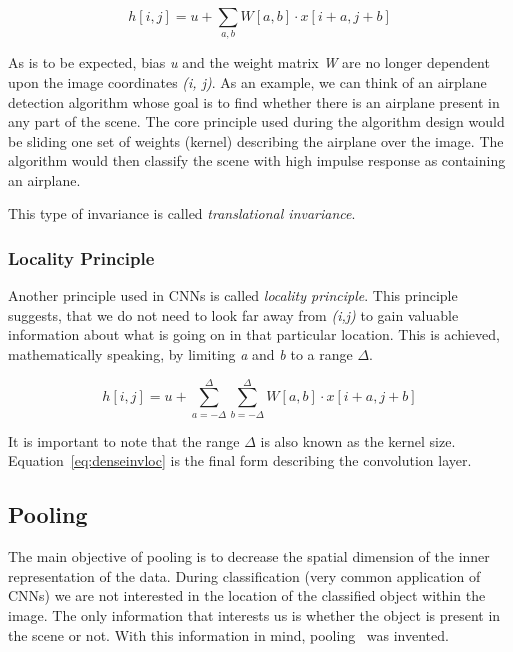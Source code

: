 \begin{equation}
    \label{eq:denseinv}
    h[i, j] = u + \sum_{a,b} W[a,b] \cdot x[i+a,j+b]
\end{equation}

As is to be expected, bias \textit{u} and the weight matrix \textit{W} are no longer dependent upon the image
coordinates \textit{(i, j)}.
As an example, we can think of an airplane detection algorithm whose goal is to find whether there is an airplane
present in any part of the scene.
The core principle used during the algorithm design would be sliding one set of weights (kernel) describing the
airplane over the image.
The algorithm would then classify the scene with high impulse response as containing an airplane.

This type of invariance is called \textit{translational invariance}.

\subsubsection{Locality Principle}\label{subsec:locality}
Another principle used in CNNs is called \textit{locality principle}.
This principle suggests, that we do not need to look far away from \textit{(i,j)} to gain valuable information about
what is going on in that particular location.
This is achieved, mathematically speaking, by limiting \textit{a} and \textit{b} to a range $\Delta$.

\begin{equation}
    \label{eq:denseinvloc}
    h[i, j] = u + \sum_{a=-\Delta}^{\Delta} \sum_{b=-\Delta}^{\Delta} W[a,b] \cdot x[i+a,j+b]
\end{equation}

It is important to note that the range $\Delta$ is also known as the kernel size.
Equation~\ref{eq:denseinvloc} is the final form describing the convolution layer.

\subsection{Pooling}\label{subsec:pooling}
The main objective of pooling is to decrease the spatial dimension of the inner representation of the data.
During classification (very common application of CNNs) we are not interested in the location of the classified
object within the image.
The only information that interests us is whether the object is present in the scene or not.
With this information in mind, pooling~\cite{PoolingLayer} was invented.

